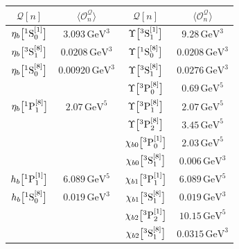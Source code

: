\newpage
\vspace*{\fill}
\renewcommand*{\arraystretch}{1.4}
\begin{longtable}[t]{cc|cc}
\toprule
${\mathcal Q}[n]$ & $\langle \mathcal O_{n}^{\mathcal Q} \rangle$ 
&
${\mathcal Q}[n]$ & $\langle \mathcal O_{n}^{\mathcal Q} \rangle$ \\
\midrule\endhead

$\eta_b\big[{}^1\mathrm{S}_0^{[1]}\big]$   & $3.093   \,\mathrm{GeV}^{3}$ & $\Upsilon\big[{}^3\mathrm{S}_1^{[1]}\big]$ & $9.28    \,\mathrm{GeV}^{3}$ \\
$\eta_b\big[{}^3\mathrm{S}_1^{[8]}\big]$   & $0.0208  \,\mathrm{GeV}^{3}$ & $\Upsilon\big[{}^1\mathrm{S}_0^{[8]}\big]$ & $0.0208  \,\mathrm{GeV}^{3}$ \\
$\eta_b\big[{}^1\mathrm{S}_0^{[8]}\big]$   & $0.00920 \,\mathrm{GeV}^{3}$ & $\Upsilon\big[{}^3\mathrm{S}_1^{[8]}\big]$ & $0.0276  \,\mathrm{GeV}^{3}$ \\
                                       &                              &  
$\Upsilon\big[{}^3\mathrm{P}_0^{[8]}\big]$ & $0.69    \,\mathrm{GeV}^{5}$ \\
$\eta_b\big[{}^1\mathrm{P}_1^{[8]}\big]$   & $2.07    \,\mathrm{GeV}^{5}$ & $\Upsilon\big[{}^3\mathrm{P}_1^{[8]}\big]$ & $2.07    \,\mathrm{GeV}^{5}$ \\
                                       &                              & 
$\Upsilon\big[{}^3\mathrm{P}_2^{[8]}\big]$ & $3.45    \,\mathrm{GeV}^{5}$ \\
\midrule
                                        &                             &  
$\chi_{b0}\big[{}^3\mathrm{P}_0^{[1]}\big]$ & $2.03   \,\mathrm{GeV}^{5}$ \\
                                        &                             &  
$\chi_{b0}\big[{}^3\mathrm{S}_1^{[8]}\big]$ & $0.006  \,\mathrm{GeV}^{3}$ \\
$h_b\big[{}^1\mathrm{P}_1^{[1]}\big]$       & $6.089  \,\mathrm{GeV}^{5}$ & $\chi_{b1}\big[{}^3\mathrm{P}_1^{[1]}\big]$ & $6.089  \,\mathrm{GeV}^{5}$ \\
$h_b\big[{}^1\mathrm{S}_0^{[8]}\big]$       & $0.019  \,\mathrm{GeV}^{3}$ & $\chi_{b1}\big[{}^3\mathrm{S}_1^{[8]}\big]$ & $0.019  \,\mathrm{GeV}^{3}$ \\
                                        &                             &  
$\chi_{b2}\big[{}^3\mathrm{P}_2^{[1]}\big]$ & $10.15  \,\mathrm{GeV}^{5}$ \\
                                        &                             &  
$\chi_{b2}\big[{}^3\mathrm{S}_1^{[8]}\big]$ & $0.0315 \,\mathrm{GeV}^{3}$ \\

\end{longtable}
